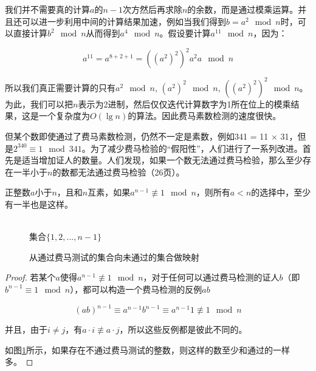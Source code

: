 \documentclass[b5paper]{ctexart}
\begin{document}
我们并不需要真的计算$a$的$n-1$次方然后再求除$n$的余数，而是通过模乘运算。并且还可以进一步利用中间的计算结果加速，例如当我们得到$b = a^2 \mod n$时，可以直接计算$b^2 \mod n$从而得到$a^4 \mod n$。假设要计算$a^{11} \mod n$，因为：

\[
a^{11} = a^{8 + 2 + 1} = ((a^2)^2)^2a^2a \mod n
\]

所以我们真正需要计算的只有$a^2 \mod n$, $(a^2)^2 \mod n$, $((a^2)^2)^2 \mod n$。为此，我们可以把$n$表示为2进制，然后仅仅迭代计算数字为1所在位上的模乘结果，这是一个复杂度为$O(\lg n)$的算法。因此费马素数检测的速度很快。

但某个数即使通过了费马素数检测，仍然不一定是素数，例如341 = 11 $\times$ 31，但是$2^{340} \equiv 1 \mod 341$。为了减少费马检验的“假阳性”，人们进行了一系列改进。首先是适当增加证人的数量。人们发现，如果一个数无法通过费马检验，那么至少存在一半小于$n$的数都无法通过费马检验\cite{Algorithms-DPV}（26页）。

\begin{theorem}
正整数$a$小于$n$，且和$n$互素，如果$a^{n-1} \not\equiv 1 \mod n$，则所有$a<n$的选择中，至少有一半也是这样。
\end{theorem}

\begin{figure}[htbp]
\centering
{} \\
集合$\{1, 2, ..., n-1\}$
\caption{从通过费马测试的集合向未通过的集合做映射}
\label{fig:Fermat-test}
\end{figure}

\begin{proof}
若某个$a$使得$a^{n-1} \not\equiv 1 \mod n$，对于任何可以通过费马检测的证人$b$（即$b^{n-1} \equiv 1 \mod n$），都可以构造一个费马检测的反例$ab$

\[
(ab)^{n-1} \equiv a^{n-1}b^{n-1} \equiv a^{n-1}1 \not\equiv 1 \mod n
\]

并且，由于$i \neq j$，有$a \cdot i \not\equiv a \cdot j$，所以这些反例都是彼此不同的。

如图\ref{fig:Fermat-test}所示，如果存在不通过费马测试的整数，则这样的数至少和通过的一样多。
\end{proof}
\end{document}
